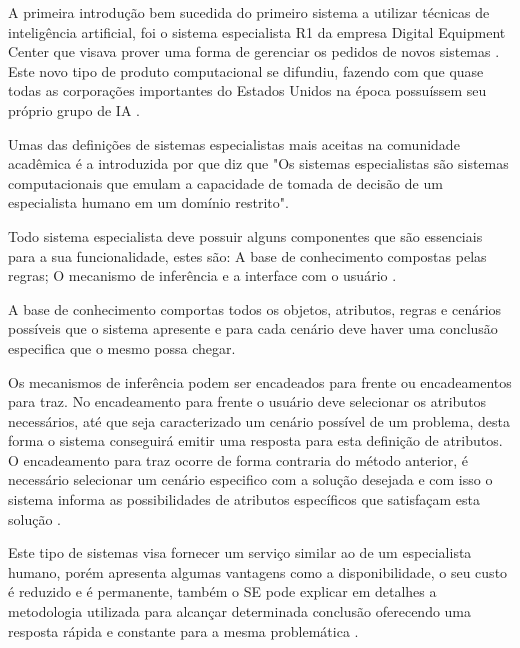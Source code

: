\documentclass[
12pt,				%
oneside,			%
a4paper,			%
english,			%
french,				%
spanish,			%
brazil				%
]{abntex2}
\begin{document}
A primeira introdução bem sucedida do primeiro sistema a utilizar técnicas de inteligência artificial, foi o sistema  especialista R1 da empresa Digital Equipment Center que visava prover uma forma de gerenciar os pedidos de novos sistemas \cite{mcdermott1982r1}. Este novo tipo de produto computacional se difundiu, fazendo com que quase todas as corporações importantes do Estados Unidos na época possuíssem seu próprio grupo de IA \cite{russell2016artificial}. 


Umas das definições de sistemas especialistas mais aceitas na comunidade acadêmica é a introduzida por  \cite{giarratano1998expert} que diz que  "Os sistemas especialistas são sistemas computacionais que emulam a capacidade de tomada de decisão de um especialista humano em um domínio restrito".

Todo sistema especialista deve possuir alguns componentes que são essenciais para a sua funcionalidade, estes são: A base de conhecimento compostas pelas regras; O mecanismo de inferência e a interface com o usuário \cite{giarratano1998expert}. 

A base de conhecimento comportas todos os objetos, atributos, regras e cenários possíveis que o sistema apresente e para cada cenário deve haver uma conclusão especifica que o mesmo possa chegar.

Os mecanismos de inferência podem ser encadeados para frente ou encadeamentos para traz. No encadeamento para frente o usuário deve selecionar os atributos necessários, até que seja caracterizado um cenário possível de um problema, desta forma o sistema conseguirá emitir uma resposta para esta definição de atributos. O encadeamento para traz ocorre de forma contraria do método anterior, é necessário selecionar um cenário especifico com a solução desejada e com isso o sistema informa as possibilidades de atributos específicos que satisfaçam esta solução \cite{giarratano1998expert}.

Este tipo de sistemas visa fornecer um serviço similar ao de um especialista humano, porém apresenta algumas vantagens como a disponibilidade, o seu custo é reduzido e é permanente, também o SE pode explicar em detalhes a metodologia utilizada para alcançar determinada conclusão oferecendo uma resposta rápida e constante para a mesma problemática \cite{marcus2013automating}. 

\end{document}
